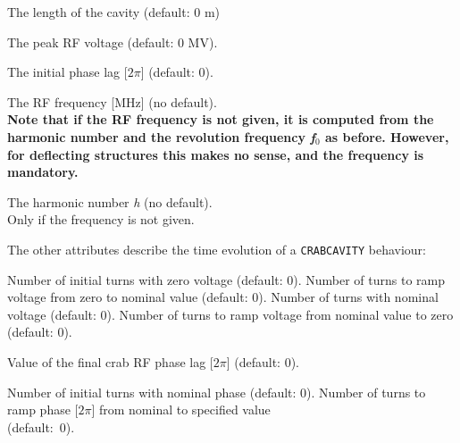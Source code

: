 \begin{madlist}
   The length of the cavity (default: 0 m) 

   The peak RF voltage (default: 0 MV). 

   The initial phase lag [$2\pi$] (default: 0). 

   The RF frequency [MHz] (no default). \\[3mm]
    \textbf{Note that if the RF frequency is not given, it is computed from the
    harmonic number and the revolution frequency \textit{f$_0$} as before. 
    However, for deflecting structures this makes no sense, and the 
    frequency is mandatory.} 

   The harmonic number \textit{h} (no default). \\
  Only if the frequency is not given. 

\end{madlist}

The other attributes describe the time evolution of a \texttt{CRABCAVITY} behaviour:

\begin{madlist}  
   Number of initial turns with zero voltage (default: 0). 
   Number of turns to ramp voltage from zero to nominal value (default: 0). 
   Number of turns with nominal voltage (default: 0). 
   Number of turns to ramp voltage from nominal value to zero (default: 0).  

   Value of the final crab RF phase lag [$2\pi$] (default: 0).

   Number of initial turns with nominal phase (default: 0). 
   Number of turns to ramp phase [$2\pi$] from nominal to
    specified value \\ (default:~0). 

\end{madlist}

